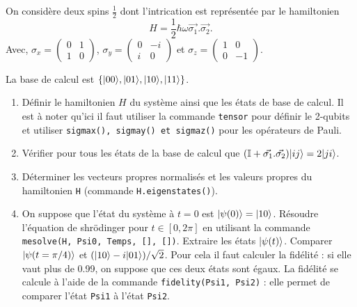 On considère deux spins $\frac{1}{2}$ dont l'intrication est représentée par le hamiltonien
\begin{equation}
H = \dfrac{1}{2}\hbar\omega\vec{\sigma_1}.\vec{\sigma_2}.
\end{equation}
Avec, $\sigma_x = \begin{pmatrix}0 & 1 \\ 1 & 0 \end{pmatrix}$, $\sigma_y = \begin{pmatrix}0 & -i \\ i & 0 \end{pmatrix}$ et
$\sigma_z = \begin{pmatrix}1 & 0 \\ 0 & -1 \end{pmatrix}$.

La base de calcul est $\{\vert00\rangle,\vert01\rangle,\vert10\rangle,\vert11\rangle\}$.
\begin{enumerate}
\item Définir le hamiltonien $H$ du système ainsi que les états de base de calcul. Il est à noter qu'ici il faut utiliser la commande \texttt{tensor} pour définir le 2-qubits et utiliser \texttt{sigmax(), sigmay() et sigmaz()} pour les opérateurs de Pauli.

\item Vérifier pour tous les états de la base de calcul que $(\mathbb{I}+\vec{\sigma_1}.\vec{\sigma_2})\vert ij\rangle=2\vert ji\rangle$.

\item Déterminer les vecteurs propres normalisés et les valeurs propres du hamiltonien \texttt{H} (commande \texttt{H.eigenstates()}).

\item On suppose que l'état du système à $t=0$ est $\vert\psi(0)\rangle=\vert10\rangle$. Résoudre l'équation de shr\"odinger pour $t\in[0,2\pi]$ en utilisant la commande \texttt{mesolve(H, Psi0, Temps, [], [])}. Extraire les états $\vert\psi(t)\rangle$. Comparer $\vert\psi(t=\pi/4)\rangle$ et $(\vert10\rangle-i\vert01\rangle)/\sqrt{2}$. Pour cela il faut calculer la fidélité : si elle vaut plus de 0.99, on suppose que ces deux états sont égaux. La fidélité se calcule à l'aide de la commande \texttt{fidelity(Psi1, Psi2)} : elle permet de comparer l'état \texttt{Psi1} à l'état \texttt{Psi2}.
\end{enumerate}
